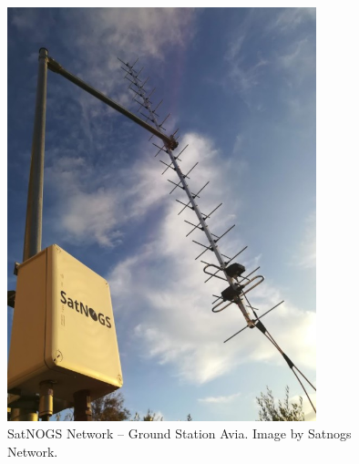 \begin{figure}[H] %
    \centering
    \includegraphics[width=0.8\textwidth]{figures/6-14.jpg}
        \caption{SatNOGS Network – Ground Station Avia. Image by Satnogs Network.}
    \label{fig:communication2}
\end{figure}
